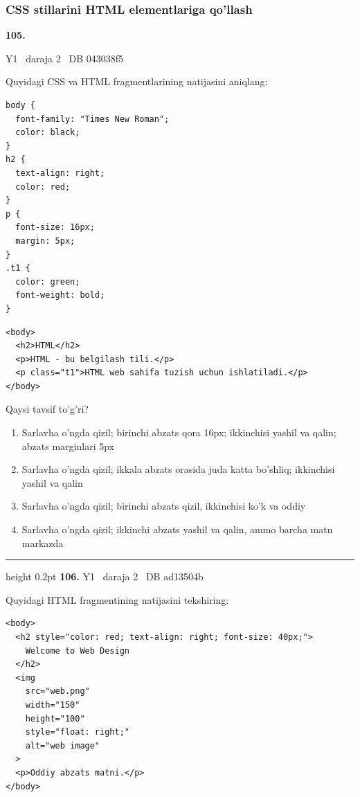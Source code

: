 \documentclass[10pt,a4paper,oneside]{article}
\begin{document}
\subsubsection{CSS stillarini HTML elementlariga qo'llash}
\hypertarget{q105}{\textbf{\color{ink}105.}}  {\color{muted}\scriptsize Y1 \textbullet\ daraja 2 \textbullet\ DB 043038f5}
\par
Quyidagi CSS va HTML fragmentlarining natijasini aniqlang:

\par
\begin{lstlisting}
body {
  font-family: "Times New Roman";
  color: black;
}
h2 {
  text-align: right;
  color: red;
}
p {
  font-size: 16px;
  margin: 5px;
}
.t1 {
  color: green;
  font-weight: bold;
}
\end{lstlisting}


\par
\begin{lstlisting}
<body>
  <h2>HTML</h2>
  <p>HTML - bu belgilash tili.</p>
  <p class="t1">HTML web sahifa tuzish uchun ishlatiladi.</p>
</body>
\end{lstlisting}


\par
Qaysi tavsif to'g'ri?
\begin{enumerate}[label=\Alph*),leftmargin=9mm]
\item Sarlavha o'ngda qizil; birinchi abzats qora 16px; ikkinchisi yashil va qalin; abzats marginlari 5px
\item Sarlavha o'ngda qizil; ikkala abzats orasida juda katta bo'shliq; ikkinchisi yashil va qalin
\item Sarlavha o'ngda qizil; birinchi abzats qizil, ikkinchisi ko'k va oddiy
\item Sarlavha o'ngda qizil; ikkinchi abzats yashil va qalin, ammo barcha matn markazda
\end{enumerate}
\vspace{2mm}\hrule height 0.2pt \vspace{4mm}
\hypertarget{q106}{\textbf{\color{ink}106.}}  {\color{muted}\scriptsize Y1 \textbullet\ daraja 2 \textbullet\ DB ad13504b}
\par
Quyidagi HTML fragmentining natijasini tekshiring:

\par
\begin{lstlisting}
<body>
  <h2 style="color: red; text-align: right; font-size: 40px;">
    Welcome to Web Design
  </h2>
  <img
    src="web.png"
    width="150"
    height="100"
    style="float: right;"
    alt="web image"
  >
  <p>Oddiy abzats matni.</p>
</body>
\end{lstlisting}
\end{document}
